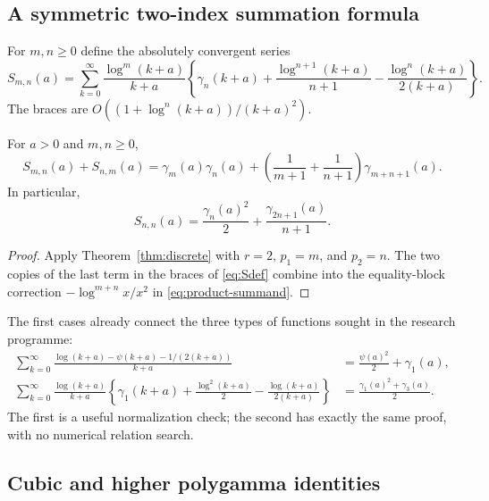\subsection{A symmetric two-index summation formula}

For $m,n\ge0$ define the absolutely convergent series
\begin{equation}\label{eq:Sdef}
 S_{m,n}(a)=\sum_{k=0}^{\infty}
 \frac{\log^m(k+a)}{k+a}
 \left\{\gamma_n(k+a)+\frac{\log^{n+1}(k+a)}{n+1}
                  -\frac{\log^n(k+a)}{2(k+a)}\right\}.
\end{equation}
The braces are $O((1+\log^n(k+a))/(k+a)^2)$.

\begin{corollary}\label{cor:Stwo}
For $a>0$ and $m,n\ge0$,
\begin{equation}\label{eq:Stwo}
 \boxed{\displaystyle S_{m,n}(a)+S_{n,m}(a)
 =\gamma_m(a)\gamma_n(a)+
 \left(\frac1{m+1}+\frac1{n+1}\right)\gamma_{m+n+1}(a).}
\end{equation}
In particular,
\begin{equation}\label{eq:Ssquare}
 S_{n,n}(a)=\frac{\gamma_n(a)^2}{2}
                      +\frac{\gamma_{2n+1}(a)}{n+1}.
\end{equation}
\end{corollary}
\begin{proof}
Apply Theorem~\ref{thm:discrete} with $r=2$, $p_1=m$, and $p_2=n$.
The two copies of the last term in the braces of \eqref{eq:Sdef}
combine into the equality-block correction
$-\log^{m+n}x/x^2$ in \eqref{eq:product-summand}.
\end{proof}

The first cases already connect the three types of functions sought in
the research programme:
\begin{align}
 \sum_{k=0}^{\infty}
 \frac{\log(k+a)-\psi(k+a)-1/(2(k+a))}{k+a}
 &=\frac{\psi(a)^2}{2}+\gamma_1(a),\label{eq:digamma-square}\\
 \sum_{k=0}^{\infty}\frac{\log(k+a)}{k+a}
 \left\{\gamma_1(k+a)+\frac{\log^2(k+a)}2
           -\frac{\log(k+a)}{2(k+a)}\right\}
 &=\frac{\gamma_1(a)^2+\gamma_3(a)}2.\label{eq:gamma1-square}
\end{align}
The first is a useful normalization check; the second has exactly the
same proof, with no numerical relation search.

\subsection{Cubic and higher polygamma identities}

